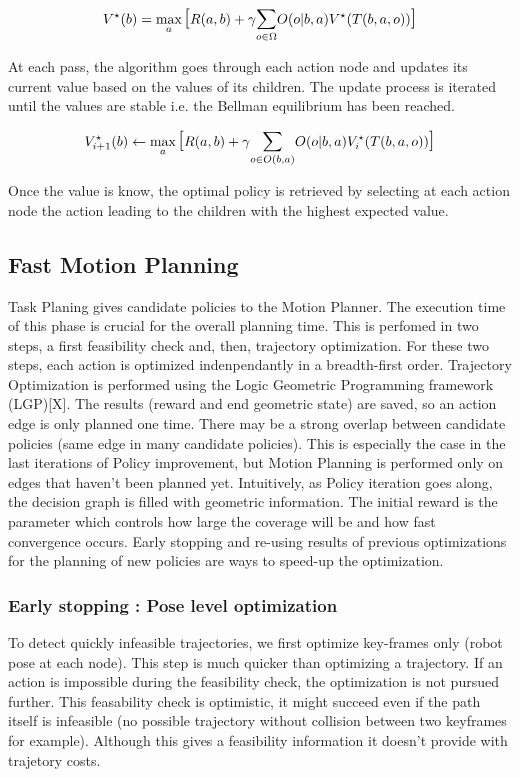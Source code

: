 \documentclass[conference]{IEEEtran}
\begin{document}
\begin{equation}
V^{\star}(b) = \max_{a} \mathlarger{\mathlarger{[}} R(a, b) + \gamma \mathlarger{\sum}_{o \in \Omega } O( o | b, a ) V^{\star}(T(b, a, o)) \mathlarger{\mathlarger{]}}
\end{equation} 

At each pass, the algorithm goes through each action node and updates its current value based on the values of its children. The update process is iterated until the values are stable i.e. the Bellman equilibrium has been reached.

\begin{equation}
V^{\star}_{i+1}(b) \leftarrow \max_{a} \mathlarger{\mathlarger{[}} R(a, b) + \gamma \mathlarger{\sum}_{o \in O(b, a) } O( o | b, a ) V^{\star}_{i}(T(b, a, o))
\mathlarger{\mathlarger{]}}
\end{equation} 

Once the value is know, the optimal policy is retrieved by selecting at each action node the action leading to the children with the highest expected value.

\subsection{Fast Motion Planning} \label{ssec:top}
Task Planing gives candidate policies to the Motion Planner. The execution time of this phase is crucial for the overall planning time. This is perfomed in two steps, a first feasibility check and, then, trajectory optimization. For these two steps, each action is optimized indenpendantly in a breadth-first order. Trajectory Optimization is performed using the Logic Geometric Programming framework (LGP)[X]. The results (reward and end geometric state) are saved, so an action edge is only planned one time. There may be a strong overlap between candidate policies (same edge in many candidate policies). This is especially the case in the last iterations of Policy improvement, but Motion Planning is performed only on edges that haven't been planned yet. Intuitively, as Policy iteration goes along, the decision graph is filled with geometric information. The initial reward is the parameter which controls how large the coverage will be and how fast convergence occurs. Early stopping and re-using results of previous optimizations for the planning of new policies are ways to speed-up the optimization.\\ 

\subsubsection{Early stopping : Pose level optimization} \label{ssec:fast}
To detect quickly infeasible trajectories, we first optimize key-frames only (robot pose at each node). This step is much quicker than optimizing a trajectory. If an action is impossible during the feasibility check, the optimization is not pursued further. This feasability check is optimistic, it might succeed even if the path itself is infeasible (no possible trajectory without collision between two keyframes for example). Although this gives a feasibility information it doesn't provide with trajetory costs.\\
\end{document}
